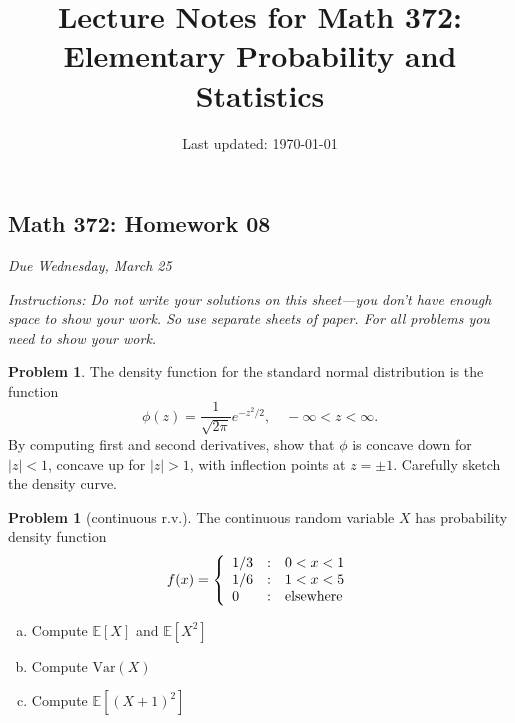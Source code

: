 \documentclass[10pt]{article}
\title{Lecture Notes for Math 372: \\Elementary Probability and Statistics}
\date{Last updated: \today}
\theoremstyle{definition}
\newtheorem{problem}[theorem]{Problem}
\newcommand{\1}[1]{\textbf{1}_{\left[#1\right]}} %
\def\E{\mathbb{E}} %
\def\Var{\mathrm{Var}} %
\begin{document}
\begin{center}
  \section*{Math 372: Homework 08}
  \textit{Due Wednesday, March 25}
\end{center}

\textit{Instructions: Do not write your solutions on this sheet---you don't have enough space to show
your work. So use separate sheets of paper. For all problems you need to show your work.}


\begin{problem}
  The density function for the standard normal distribution is the function
  \begin{equation*}
    \phi(z)=\frac{1}{\sqrt{2\pi}}e^{-z^{2}/2}, \quad -\infty<z<\infty.
  \end{equation*}
  By computing first and second derivatives, show that $\phi$ is concave down
  for $|z|<1$, concave up for $|z|>1$, with inflection points at $z=\pm 1$.
  Carefully sketch the density curve.
\end{problem}



\begin{problem}[continuous r.v.]
  The continuous random variable $X$ has probability density function
  \begin{equation*}
    f(x) = \left\{ \begin{array}{l@{\quad:\quad}l}
        1/3& 0<x<1\\
        1/6& 1<x<5\\
        0& \text{elsewhere}
      \end{array}\right.
  \end{equation*}
  \begin{enumerate}[(a)]
    \item Compute $\E\left[X \right]$ and $\E\left[X^{2} \right]$
    \item Compute $\Var(X)$
    \item Compute $\E\left[(X+1)^{2} \right]$
  \end{enumerate}
\end{problem}
\end{document}
